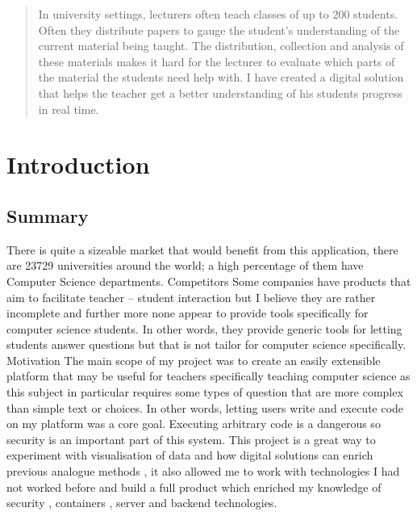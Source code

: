 \documentclass[12pt]{article}
\begin{document}
\maketitle

\clearpage

\begin{abstract}
In university settings, lecturers often teach classes of up to 200 students. Often they distribute papers to gauge the student’s understanding of the current material being taught. The distribution, collection and analysis of these materials makes it hard for the lecturer to evaluate which parts of the material the students need help with.
I have created a digital solution that helps the teacher get a better understanding of his students progress in real time.

\end{abstract}
\clearpage

\doublespacing
\tableofcontents
\singlespacing
\clearpage



\section{Introduction}
\subsection{Summary}
There is quite a sizeable market that would benefit from this application, there are 23729 universities around the world; a high percentage of them have Computer Science departments.
Competitors
Some companies have products that aim to facilitate teacher – student interaction but I believe they are rather incomplete and further more none appear to provide tools specifically for computer science students. In other words, they provide generic tools for letting students answer questions but that is not tailor for computer science specifically.
Motivation
The main scope of my project was to create an easily extensible platform that may be useful for teachers specifically teaching computer science as this subject in particular requires some types of question that are more complex than simple text or choices. In other words, letting users write and execute code on my platform was a core goal. Executing arbitrary code is a dangerous so security is an important part of this system.
This project is a great way to experiment with visualisation of data and how digital solutions can enrich previous analogue methods , it also allowed me to work with technologies I had not worked before and build a full product which enriched my knowledge of security , containers , server and backend technologies.
\end{document}
